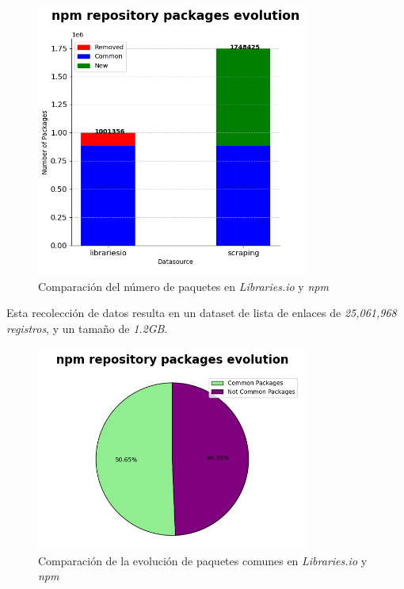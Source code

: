 \begin{figure}[ht!]
    \begin{center}
        \includegraphics[width=0.8\textwidth]{img/npm/bars.png}
        \caption{Comparación del número de paquetes en \textit{Libraries.io} y \textit{npm}}
    \end{center}
    \label{fig:npm_bars}
\end{figure}

Esta recolección de datos resulta en un dataset de lista de enlaces de \textit{25,061,968 registros}, y un tamaño de \textit{1.2GB}.

\begin{figure}[ht!]
    \begin{center}
        \includegraphics[width=0.8\textwidth]{img/npm/circ.png}
        \caption{Comparación de la evolución de paquetes comunes en \textit{Libraries.io} y \textit{npm}}
    \end{center}
    \label{fig:npm_circ}
\end{figure}



